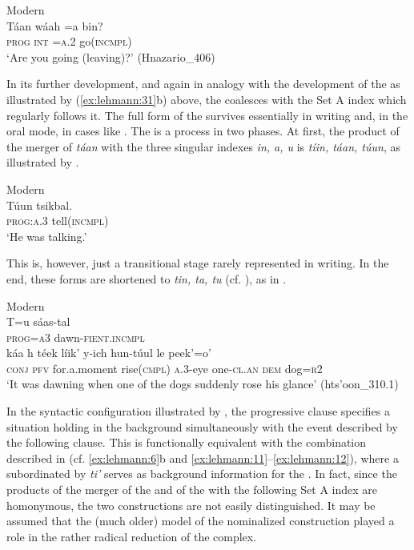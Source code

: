\documentclass[output=paper]{langsci/langscibook}
\begin{document}
\ea\label{ex:lehmann:43}
Modern  \\
\gll      Táan  wáah  =a    bin?\\
  \textsc{prog  }   \textsc{int }    \textsc{=a.2}    go(\textsc{incmpl)}\\
\glt ‘Are you going (leaving)?’ (Hnazario\_406)
\z



In its further development, and again in analogy with the development of the   as illustrated by (\ref{ex:lehmann:31}b) above, the  coalesces with the Set A index which regularly follows it. The full form of the  survives essentially in writing and, in the oral mode, in cases like . The  is a process in two phases. At first, the product of the merger of \textit{táan} with the three singular indexes \textit{in, a, u} is \textit{tíin, táan, túun}, as illustrated by .


\ea\label{ex:lehmann:44}
Modern  \\
\gll Túun    tsikbal.\\
  \textsc{prog:a.3}  tell(\textsc{incmpl})\\
\glt ‘He was talking.’ \citep[48]{Monforte2011}
\z


This is, however, just a transitional stage rarely represented in writing. In the end, these forms are shortened to \textit{tin, ta, tu} (cf. \citealt[24f]{BriceñoChel2006}), as in .


\ea\label{ex:lehmann:45}
Modern  \\
\gll       T=u      sáas-tal\\
  \textsc{prog=a3}  dawn-\textsc{fient.incmpl}\\

\gll   káa    h    téek          líik'        y-ich    hun-túul    le      peek'=o'\\
\textsc{conj }    \textsc{pfv}  for.a.moment  rise(\textsc{cmpl) } \textsc{a.3}{}-eye    one-\textsc{cl.an  }   \textsc{dem}    dog=\textsc{r2}\\
\glt ‘It was dawning when one of the dogs suddenly rose his glance’ (hts'oon\_310.1)
\z



In the syntactic configuration illustrated by , the progressive clause specifies a situation holding in the background simultaneously with the event described by the following %
clause. This is functionally equivalent with the combination described in  (cf. \ref{ex:lehmann:6}b and \ref{ex:lehmann:11}–\ref{ex:lehmann:12}), where a  subordinated by \textit{ti’} serves as background information for the . In fact, since the products of the merger of the  and of the  with the following Set A index are homonymous, the two constructions are not easily distinguished. It may be assumed that the (much older) model of the nominalized construction played a role in the rather radical reduction of the  complex.
\end{document}
